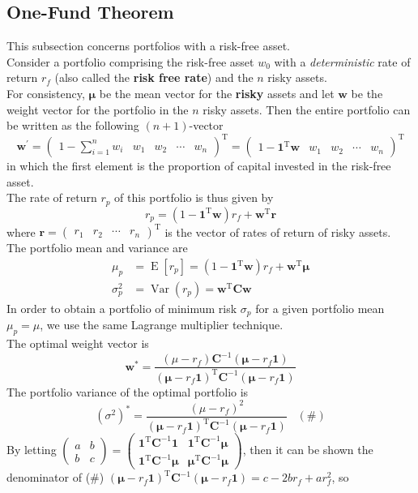 \documentclass[12pt]{article}
\theoremstyle{definition}
\DeclareMathOperator{\expec}{E}
\DeclareMathOperator{\var}{Var}
\begin{document}
\subsection{One-Fund Theorem}
This subsection concerns portfolios with a risk-free asset.\\
Consider a portfolio comprising the risk-free asset $w_0$ with a \textit{deterministic} rate of return $r_f$ (also called the \textbf{risk free rate}) and the $n$ risky assets.\\For consistency, $\bm{\mu}$ be the mean vector for the \textbf{risky} assets and let $\mathbf{w}$ be the weight vector for the portfolio in the $n$ risky assets. Then the entire portfolio can be written as the following $(n+1)$-vector
\[
\mathbf{w}^\prime = \begin{pmatrix}1-\sum_{i=1}^n w_i&w_1&w_2&\cdots&w_n\end{pmatrix}^\text{T}=\begin{pmatrix}1-\mathbf{1}^\text{T}\mathbf{w}&w_1&w_2&\cdots&w_n\end{pmatrix}^\text{T}
\]
in which the first element is the proportion of capital invested in the risk-free asset.\\
The rate of return $r_p$ of this portfolio is thus given by
\[
r_p=(1-\mathbf{1}^\text{T}\mathbf{w})r_f+\mathbf{w}^\text{T}\mathbf{r}
\]
where $\mathbf{r}=\begin{pmatrix}r_1&r_2&\cdots&r_n\end{pmatrix}^\text{T}$ is the vector of rates of return of risky assets.\\
The portfolio mean and variance are
\begin{align*}
\mu_p &= \expec[r_p]=(1-\mathbf{1}^\text{T}\mathbf{w})r_f+\mathbf{w}^\text{T}\bm{\mu}\\
\sigma_p^2&=\var(r_p)=\mathbf{w}^\text{T}\mathbf{Cw}
\end{align*}
In order to obtain a portfolio of minimum risk $\sigma_p$ for a given portfolio mean $\mu_p=\mu$, we use the same Lagrange multiplier technique.\\
The optimal weight vector is
\[
\mathbf{w}^\ast = \frac{(\mu-r_f)\mathbf{C}^{-1}(\bm{\mu}-r_f\mathbf{1})}{(\bm{\mu}-r_f\mathbf{1})^\text{T}\mathbf{C}^{-1}(\bm{\mu}-r_f\mathbf{1})}
\]
The portfolio variance of the optimal portfolio is
\[
(\sigma^2)^\ast = \frac{(\mu-r_f)^2}{(\bm{\mu}-r_f\mathbf{1})^\text{T}\mathbf{C}^{-1}(\bm{\mu}-r_f\mathbf{1})}\;\;\;(\#)
\]
By letting $\begin{pmatrix}a&b\\b&c\end{pmatrix}=\begin{pmatrix}\mathbf{1}^\text{T}\mathbf{C}^{-1}\mathbf{1}&\mathbf{1}^\text{T}\mathbf{C}^{-1}\bm{\mu}\\\mathbf{1}^\text{T}\mathbf{C}^{-1}\bm{\mu}&\bm{\mu}^\text{T}\mathbf{C}^{-1}\bm{\mu}\end{pmatrix}$, then it can be shown the denominator of (\#) $(\bm{\mu}-r_f\mathbf{1})^\text{T}\mathbf{C}^{-1}(\bm{\mu}-r_f\mathbf{1})=c-2br_f+ar_f^2$, so 
\end{document}
